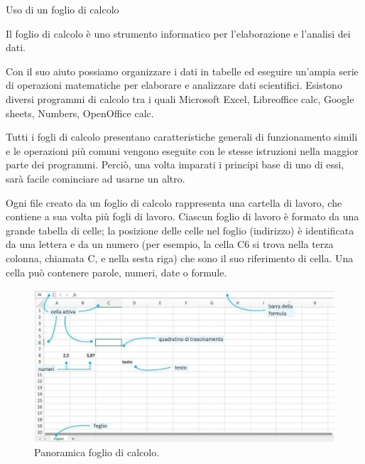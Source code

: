 \documentclass[12pt,a4paper,oneside]{book}
\makeatletter
\renewcommand{\section}{\@startsection{section}{1}{\z@}
{-4ex \@plus -1ex \@minus -.4ex}
{1ex \@plus.2ex }
{\normalfont\large\sffamily\bfseries}}
\theoremstyle{esercizio}
\makeatother
\begin{document}
 










\section{Uso di un foglio di calcolo}

\begin{definizione}
    Il foglio di calcolo è uno strumento informatico per l'elaborazione e l'analisi  dei dati.
\end{definizione}

Con il suo aiuto possiamo organizzare  i dati in tabelle ed eseguire un'ampia serie di operazioni matematiche per elaborare e analizzare dati scientifici. Esistono diversi programmi di calcolo tra i quali Microsoft Excel, Libreoffice calc, Google sheets, Numbers, OpenOffice calc. 

\begin{remark}
Tutti i fogli di calcolo presentano caratteristiche generali di funzionamento simili e le operazioni più comuni vengono eseguite con le stesse istruzioni nella maggior parte dei programmi. Perciò, una volta imparati i principi base di uno di essi, sarà facile cominciare ad usarne un altro. 
    \end{remark}

    Ogni file creato da un foglio di calcolo rappresenta una cartella di lavoro, che contiene a sua volta più fogli di lavoro. Ciascun foglio di lavoro è formato da una grande tabella di celle; la posizione delle celle nel foglio (indirizzo) è identificata da una lettera e da un numero (per esempio, la cella C6 si trova nella terza colonna, chiamata C, e nella sesta riga) che sono il suo riferimento di cella.
    Una cella può contenere parole, numeri, date o formule.
    \begin{figure}[h!]
        \centering
        \includegraphics[width=\linewidth]{img/calc.png} 
        \caption{Panoramica foglio di calcolo.}
        \label{fig:librecalc}
    \end{figure} 
\end{document}

